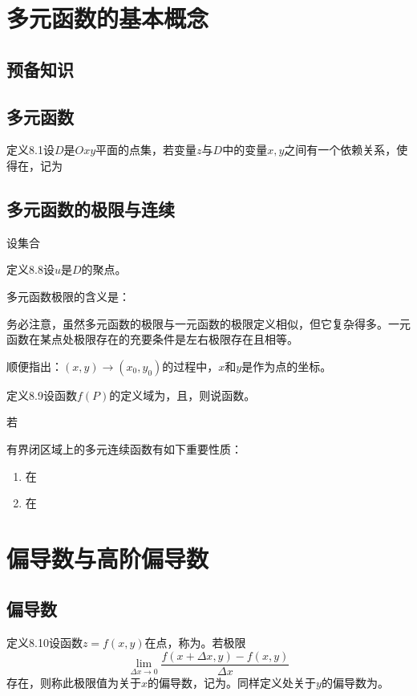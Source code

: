 
\section{多元函数的基本概念}
\subsection{预备知识}

\subsection{多元函数}

定义8.1\quad 设$D$是$Oxy$平面的点集，若变量$z$与$D$中的变量$x,y$之间有一个依赖关系，使得在，记为

\subsection{多元函数的极限与连续}

设集合

定义8.8\quad 设$u$是$D$的聚点。

多元函数极限的含义是：

务必注意，虽然多元函数的极限与一元函数的极限定义相似，但它复杂得多。一元函数在某点处极限存在的充要条件是左右极限存在且相等。

顺便指出：$(x,y)\to(x_0,y_0)$的过程中，$x$和$y$是作为点的坐标。

定义8.9\quad 设函数$f(P)$的定义域为，且，则说函数。

若

有界闭区域上的多元连续函数有如下重要性质：
\begin{enumerate}
    \item 在
    \item 在
\end{enumerate}

\section{偏导数与高阶偏导数}
\subsection{偏导数}

定义8.10\quad 设函数$z=f(x,y)$在点，称为。若极限
\[
\lim_{\Delta x\to0}\frac{f(x+\Delta x,y)-f(x,y)}{\Delta x}
\]
存在，则称此极限值为关于$x$的偏导数，记为。同样定义处关于$y$的偏导数为。

